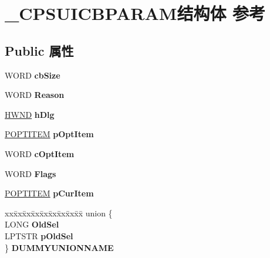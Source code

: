 \hypertarget{struct___c_p_s_u_i_c_b_p_a_r_a_m}{}\section{\+\_\+\+C\+P\+S\+U\+I\+C\+B\+P\+A\+R\+A\+M结构体 参考}
\label{struct___c_p_s_u_i_c_b_p_a_r_a_m}
\subsection*{Public 属性}
\begin{DoxyCompactItemize}
\item 
\mbox{\label{struct___c_p_s_u_i_c_b_p_a_r_a_m_a6870ccb69f24d6862881f766511a07ec}} 
W\+O\+RD {\bfseries cb\+Size}
\item 
\mbox{\label{struct___c_p_s_u_i_c_b_p_a_r_a_m_ad7f2d83507a11813c178d6d11848a77b}} 
W\+O\+RD {\bfseries Reason}
\item 
\mbox{\label{struct___c_p_s_u_i_c_b_p_a_r_a_m_a42edb9f304cd9386825819f28e547317}} 
\hyperlink{interfacevoid}{H\+W\+ND} {\bfseries h\+Dlg}
\item 
\mbox{\label{struct___c_p_s_u_i_c_b_p_a_r_a_m_aa5fe4e744c1147eada7d52fb5ee591f3}} 
\hyperlink{struct___o_p_t_i_t_e_m}{P\+O\+P\+T\+I\+T\+EM} {\bfseries p\+Opt\+Item}
\item 
\mbox{\label{struct___c_p_s_u_i_c_b_p_a_r_a_m_a0d94347489ac6481cb24c156bf41741a}} 
W\+O\+RD {\bfseries c\+Opt\+Item}
\item 
\mbox{\label{struct___c_p_s_u_i_c_b_p_a_r_a_m_a0f142ba4bab2eb9ca10ca4f5b2c290ff}} 
W\+O\+RD {\bfseries Flags}
\item 
\mbox{\label{struct___c_p_s_u_i_c_b_p_a_r_a_m_a50f044973fb3ab444167d9571f57081d}} 
\hyperlink{struct___o_p_t_i_t_e_m}{P\+O\+P\+T\+I\+T\+EM} {\bfseries p\+Cur\+Item}
\item 
\mbox{\label{struct___c_p_s_u_i_c_b_p_a_r_a_m_a6be675bf2cc188992574dded1a7884db}} 
\begin{tabbing}
xx\=xx\=xx\=xx\=xx\=xx\=xx\=xx\=xx\=\kill
union \{\\
\>LONG {\bfseries OldSel}\\
\>LPTSTR {\bfseries pOldSel}\\
\} {\bfseries DUMMYUNIONNAME}\\


\end{tabbing}
\end{DoxyCompactItemize}
